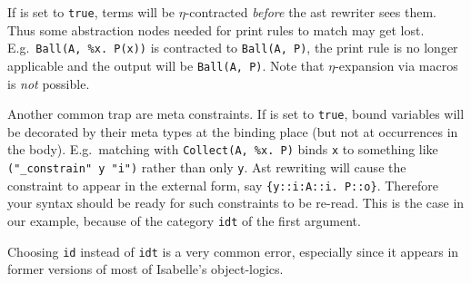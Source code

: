 \begin{warn}
If  is set to {\tt true}, terms will be
$\eta$-contracted {\em before} the ast rewriter sees them. Thus some
abstraction nodes needed for print rules to match may get lost. E.g.\
\verb|Ball(A, %x. P(x))| is contracted to {\tt Ball(A, P)}, the print rule is
no longer applicable and the output will be {\tt Ball(A, P)}. Note that
$\eta$-expansion via macros is {\em not} possible.
\end{warn}

\medskip
Another common trap are meta constraints. If  is set to
{\tt true}, bound variables will be decorated by their meta types at the
binding place (but not at occurrences in the body). E.g.\ matching with
\verb|Collect(A, %x. P)| binds {\tt x} to something like {\tt ("_constrain" y
"i")} rather than only {\tt y}. Ast rewriting will cause the constraint to
appear in the external form, say \verb|{y::i:A::i. P::o}|. Therefore your
syntax should be ready for such constraints to be re-read. This is the case
in our example, because of the category {\tt idt} of the first argument.

\begin{warn}
Choosing {\tt id} instead of {\tt idt} is a very common error, especially
since it appears in former versions of most of Isabelle's object-logics.
\end{warn}

